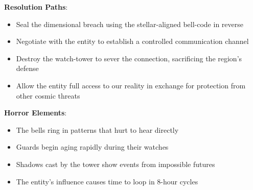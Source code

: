 \documentclass[11pt]{article}
\begin{document}
\begin{mdframed}[backgroundcolor=horrorbg]
\textbf{Resolution Paths}:
\begin{itemize}[leftmargin=*]
\item Seal the dimensional breach using the stellar-aligned bell-code in reverse
\item Negotiate with the entity to establish a controlled communication channel
\item Destroy the watch-tower to sever the connection, sacrificing the region's defense
\item Allow the entity full access to our reality in exchange for protection from other cosmic threats
\end{itemize}

\textbf{Horror Elements}:
\begin{itemize}[leftmargin=*]
\item The bells ring in patterns that hurt to hear directly
\item Guards begin aging rapidly during their watches
\item Shadows cast by the tower show events from impossible futures
\item The entity's influence causes time to loop in 8-hour cycles
\end{itemize}
\end{mdframed}
\end{document}
